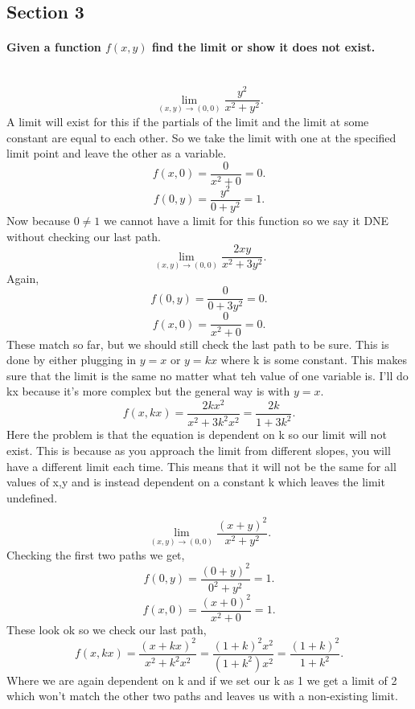 \documentclass{report}
\begin{document}
\begin{multicols}{2}
\subsection{Section 3}%
\label{sub: Section 3 }
\paragraph{Given a function $ f\left( x,y \right)  $ find the limit or show it does not exist. \\ \\}
\[
\lim_{ \left( x,y \right)  \to \left( 0,0 \right)} \frac{ y^2 }{ x^2+y^2 }
.\] 
A limit will exist for this if the partials of the limit and the limit at some constant are equal to each other. So we take the limit with one at the specified limit point and leave the other as a variable.
\[
f\left( x,0 \right) = \frac{ 0 }{ x^2+0 } = 0
.\] 
\[
f\left( 0,y \right) = \frac{ y^2 }{ 0+y^2 }=1
.\] 
Now because $ 0 \neq 1 $  we cannot have a limit for this function so we say it DNE without checking our last path. 
\[
\lim_{ \left( x,y \right)  \to \left( 0,0 \right) } \frac{ 2xy }{ x^2+3y^2 }
.\] 
Again,
\[
f\left( 0,y \right) = \frac{ 0 }{ 0+3y^2 } = 0
.\] 
\[
f\left( x,0 \right) = \frac{ 0 }{ x^2+0 } = 0
.\] 
These match so far, but we should still check the last path to be sure. This is done by either plugging in $ y=x $ or $ y=kx $ where k is some constant. This makes sure that the limit is the same no matter what teh value of one variable is. I'll do kx because it's more complex but the general way is with $ y=x $.
\[
f\left( x,kx \right) = \frac{ 2kx^2 }{ x^2+3k^2x^2 } = \frac{ 2k }{ 1+3k^2 }
.\] 
Here the problem is that the equation is dependent on k so our limit will not exist. This is because as you approach the limit from different slopes, you will have a different limit each time. This means that it will not be the same for all values of x,y and is instead dependent on a constant k which leaves the limit undefined.

\[
\lim_{ \left( x,y \right)  \to \left( 0,0 \right) } \frac{ \left( x+y \right) ^2 }{ x^2+y^2 }
.\] 
Checking the first two paths we get,
\[
f\left( 0,y \right) = \frac{ \left( 0+y \right) ^2 }{ 0^2+y^2 } = 1
.\] 
\[
f\left( x,0 \right) = \frac{ \left( x+0 \right) ^2 }{ x^2+0 } = 1
.\] 
These look ok so we check our last path,
\[
f\left( x,kx \right) = \frac{ \left( x+kx \right) ^2 }{ x^2+k^2x^2 } = \frac{ \left( 1+k \right) ^2 x^2 }{ \left( 1+k^2 \right) x^2 } = \frac{ \left( 1+k \right) ^2 }{ 1+k^2 }
.\] 
Where we are again dependent on k and if we set our k as 1 we get a limit of 2 which won't match the other two paths and leaves us with a non-existing limit. 

\end{multicols}
\end{document}
